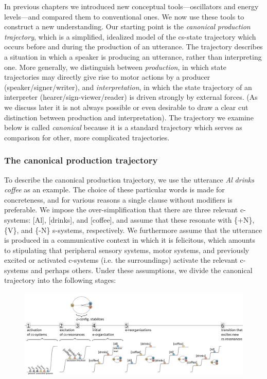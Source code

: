 In previous chapters we introduced new conceptual tools—oscillators and energy levels—and compared them to conventional ones. We now use these tools to construct a new understanding. Our starting point is the \textit{canonical} \textit{production} \textit{trajectory}, which is a simplified, idealized model of the cs-state trajectory which occurs before and during the production of an utterance. The trajectory describes a situation in which a speaker is producing an utterance, rather than interpreting one. More generally, we distinguish between \textit{production}, in which state trajectories may directly give rise to motor actions by a producer (speaker/signer/writer), and \textit{interpretation}, in which the state trajectory of an interpreter (hearer/sign-viewer/reader) is driven strongly by external forces. (As we discuss later it is not always possible or even desirable to draw a clear cut distinction between production and interpretation). The trajectory we examine below is called \textit{canonical} because it is a standard trajectory which serves as comparison for other, more complicated trajectories.

\subsubsection{The canonical production trajectory}

To describe the canonical production trajectory, we use the utterance \textit{Al} \textit{drinks} \textit{coffee} as an example. The choice of these particular words is made for concreteness, and for various reasons a single clause without modifiers is preferable. We impose the over-simplification that there are three relevant c-systems: [Al], [drinks], and [coffee], and assume that these resonate with \{+N\}, \{V\}, and \{-N\} s-systems, respectively. We furthermore assume that the utterance is produced in a communicative context in which it is felicitous, which amounts to stipulating that peripheral sensory systems, motor systems, and previously excited or activated c-systems (i.e. the surroundings) activate the relevant c-systems and perhaps others. Under these assumptions, we divide the canonical trajectory into the following stages:

  
\begin{figure}
\includegraphics[width=\textwidth]{figures/Tilsen-img51.png}
\caption{\missingcaption}
\label{fig:}
\end{figure}
 

